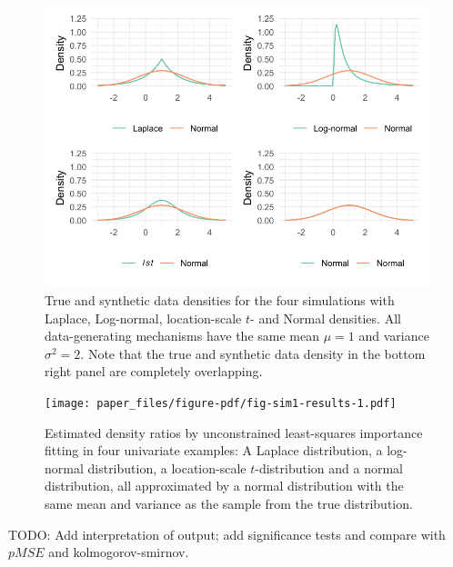 \documentclass[
]{article}
\begin{document}
\begin{figure}[t]

{\centering \includegraphics[width=1\textwidth,height=\textheight]{paper_files/figure-pdf/fig-densities-sim1-1.pdf}

}

\caption{\label{fig-densities-sim1}True and synthetic data densities for
the four simulations with Laplace, Log-normal, location-scale \(t\)- and
Normal densities. All data-generating mechanisms have the same mean
\(\mu = 1\) and variance \(\sigma^2 = 2\). Note that the true and
synthetic data density in the bottom right panel are completely
overlapping.}

\end{figure}

\begin{figure}[t]

{\centering \texttt{[image: paper\_files/figure-pdf/fig-sim1-results-1.pdf]}

}

\caption{\label{fig-sim1-results}Estimated density ratios by
unconstrained least-squares importance fitting in four univariate
examples: A Laplace distribution, a log-normal distribution, a
location-scale \(t\)-distribution and a normal distribution, all
approximated by a normal distribution with the same mean and variance as
the sample from the true distribution.}

\end{figure}

TODO: Add interpretation of output; add significance tests and compare
with \(pMSE\) and kolmogorov-smirnov.
\end{document}
